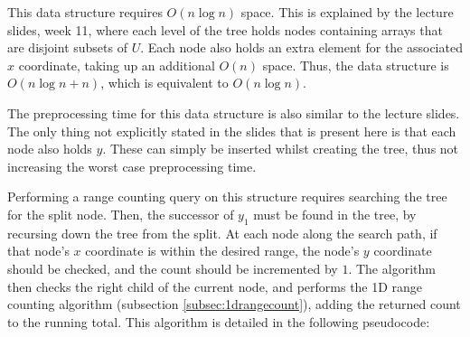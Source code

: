 \documentclass[paper=a4, fontsize=12pt]{article}
\begin{document}
This data structure requires \(O(n \log n)\) space. This is explained by the
lecture slides, week 11, where each level of the tree holds nodes containing
arrays that are disjoint subsets of \(U\). Each node also holds an extra
element for the associated \(x\) coordinate, taking up an additional \(O(n)\)
space. Thus, the data structure is \(O(n \log n + n)\), which is equivalent to
\(O(n \log n)\).

The preprocessing time for this data structure is also similar to the lecture
slides. The only thing not explicitly stated in the slides that is present here
is that each node also holds \(y\). These can simply be inserted whilst
creating the tree, thus not increasing the worst case preprocessing time.

Performing a range counting query on this structure requires searching the tree
for the split node. Then, the successor of \(y_1\) must be found in the tree,
by recursing down the tree from the split. At each node along the search path,
if that node's \(x\) coordinate is within the desired range, the node's \(y\)
coordinate should be checked, and the count should be incremented by \(1\). The
algorithm then checks the right child of the current node, and performs the 1D
range counting algorithm (subsection \ref{subsec:1drangecount}), adding the
returned count to the running total. This algorithm is detailed in the
following pseudocode:
\end{document}
